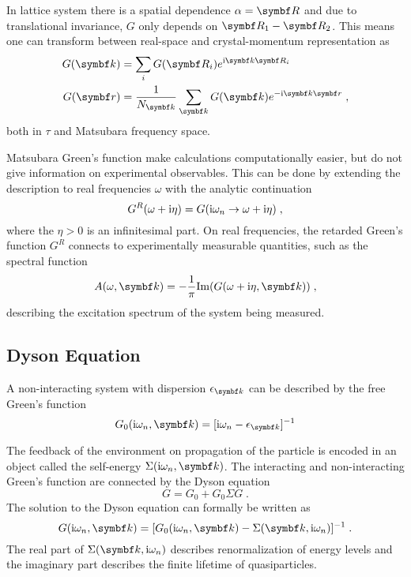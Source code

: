 \documentclass[../main.tex]{subfiles}
\begin{document}
In lattice system there is a spatial dependence \(\alpha = \vb{R}\) and due to translational invariance, \(G\) only depends on \(\vb{R}_1 - \vb{R}_2\).
This means one can transform between real-space and crystal-momentum representation as
\begin{align}
	G (\vb{k}) &= \sum_i G(\vb{R}_i) e^{\iu \vb{k} \vb{R}_i} \\
	G(\vb{r}) &= \frac{1}{N_{\vb{k}}} \sum_{\vb{k}} G(\vb{k}) e^{-\iu \vb{k} \vb{r}} \;,
\end{align}
both in \(\tau\) and Matsubara frequency space.

Matsubara Green's function make calculations computationally easier, but do not give information on experimental observables.
This can be done by extending the description to real frequencies \(\omega\) with the analytic continuation \cite{bruusManyBodyQuantumTheory2004}
\begin{equation}
	G^R (\omega + \mathrm{i} \eta) = G (\mathrm{i} \omega_n \to \omega + \mathrm{i} \eta) \;,
\end{equation}
where the \(\eta > 0\) is an infinitesimal part.
On real frequencies, the retarded Green's function \(G^R\) connects to experimentally measurable quantities, such as the spectral function
\begin{equation}
	A (\omega, \vb{k}) = -\frac{1}{\pi} \IM (G (\omega + \iu \eta, \vb{k})) \;,
\end{equation}
describing the excitation spectrum of the system being measured.

\subsection*{Dyson Equation}

A non-interacting system with dispersion \(\epsilon_{\vb{k}}\) can be described by the free Green's function
\begin{equation}
	G_0 (\iu \omega_n, \vb{k}) = [\iu \omega_n - \epsilon_{\vb{k}}]^{-1}
\end{equation}

The feedback of the environment on propagation of the particle is encoded in an object called the self-energy \(\Sigma (\iu \omega_n, \vb{k})\).
The interacting and non-interacting Green's function are connected by the Dyson equation
\begin{equation}
	G = G_0 + G_0 \Sigma G \;.
\end{equation}
The solution to the Dyson equation can formally be written as
\begin{equation}
	G (\iu \omega_n, \vb{k}) = [G_0 (\iu \omega_n, \vb{k}) - \Sigma (\vb{k}, \iu \omega_n)]^{-1} \;.
\end{equation}
The real part of \(\Sigma (\vb{k}, \iu \omega_n)\) describes renormalization of energy levels and the imaginary part describes the finite lifetime of quasiparticles.
\end{document}
